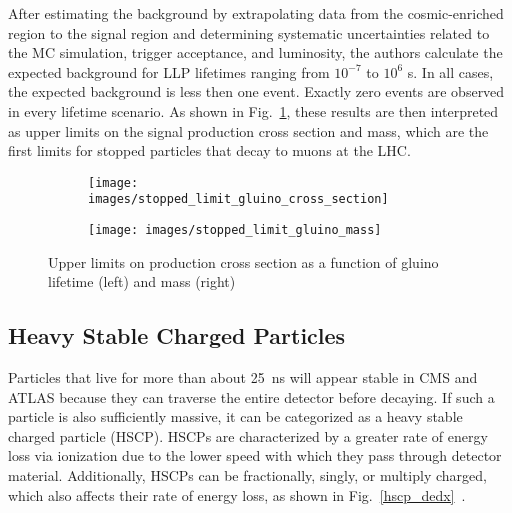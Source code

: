 \documentclass[12pt]{article}
\begin{document}
        After estimating the background by extrapolating data from the cosmic-enriched region to the signal region and determining systematic uncertainties related to the MC simulation, trigger acceptance, and luminosity, the authors calculate the expected background for LLP lifetimes ranging from $10^{-7}$ to $10^6$ s. In all cases, the expected background is less then one event. Exactly zero events are observed in every lifetime scenario. As shown in Fig.~\ref{stopped_limits}, these results are then interpreted as upper limits on the signal production cross section and mass, which are the first limits for stopped particles that decay to muons at the LHC.

        \noindent \begin{figure}[htbp] \begin{center}
        \begin{subfigure}[htbp]{0.5\textwidth} \begin{center}
        \texttt{[image: images/stopped\_limit\_gluino\_cross\_section]}
        \end{center} \end{subfigure}
        \begin{subfigure}[htbp]{0.45\textwidth} \begin{center}
        \texttt{[image: images/stopped\_limit\_gluino\_mass]}
        \end{center} \end{subfigure}
            \caption{Upper limits on production cross section as a function of gluino lifetime (left) and mass (right)~\cite{cms_stopped}}
        \label{stopped_limits}
        \end{center} \end{figure}

    \subsection{Heavy Stable Charged Particles}
        Particles that live for more than about \SI{25}{\nano\s} will appear stable in CMS and ATLAS because they can traverse the entire detector before decaying. If such a particle is also sufficiently massive, it can be categorized as a heavy stable charged particle (HSCP). HSCPs are characterized by a greater rate of energy loss via ionization due to the lower speed with which they pass through detector material. Additionally, HSCPs can be fractionally, singly, or multiply charged, which also affects their rate of energy loss, as shown in Fig.~\ref{hscp_dedx}~\cite{cms_hscp}.
\end{document}
